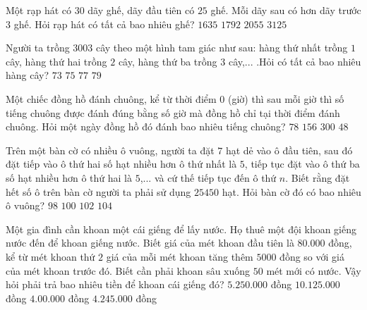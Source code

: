 \begin{ex}%
	Một rạp hát có $30$ dãy ghế, dãy đầu tiên có $25$ ghế. Mỗi dãy sau có hơn dãy trước $3$ ghế. Hỏi rạp
	hát có tất cả bao nhiêu ghế?
	\choice
	{$1635$}
	{$1792$}
	{\True $2055$}
	{$3125$}
\end{ex}
\begin{ex}%
	Người ta trồng $3003$ cây theo một hình tam giác như sau: hàng thứ nhất trồng $1$ cây, hàng thứ hai trồng $2$ cây, hàng thứ ba trồng $3$ cây,... .Hỏi có tất cả bao nhiêu hàng cây?
	\choice
	{$73$}
	{$75$}
	{\True $77$}
	{$79$}
\end{ex}
\begin{ex}%
	Một chiếc đồng hồ đánh chuông, kể từ thời điểm $0$ (giờ) thì sau mỗi giờ thì số tiếng chuông được đánh đúng bằng số giờ mà đồng hồ chỉ tại thời điểm đánh chuông. Hỏi một ngày đồng hồ đó đánh bao nhiêu tiếng chuông?
	\choice
	{$78$}
	{$156$}
	{\True $300$}
	{$48$}
\end{ex}
\begin{ex}%
	Trên một bàn cờ có nhiều ô vuông, người ta đặt $7$ hạt dẻ vào ô đầu tiên, sau đó đặt tiếp vào ô thứ
	hai số hạt nhiều hơn ô thứ nhất là $5$, tiếp tục đặt vào ô thứ ba số hạt nhiều hơn ô thứ hai là $5$,...
	và cứ thế tiếp tục đến ô thứ $n$. Biết rằng đặt hết số ô trên bàn cờ người ta phải sử dụng $25450$
	hạt. Hỏi bàn cờ đó có bao nhiêu ô vuông?
	\choice
	{$98$}
	{\True $100$}
	{$102$}
	{$104$}
\end{ex}
\begin{ex}%
	Một gia đình cần khoan một cái giếng để lấy nước. Họ thuê một đội khoan giếng nước đến để khoan giếng nước. Biết giá của mét khoan đầu tiên là $80.000$ đồng, kể từ mét khoan thứ $2$ giá của mỗi mét khoan tăng thêm $5000$ đồng so với giá của mét khoan trước đó. Biết cần phải khoan sâu xuống $50$ mét mới có nước. Vậy hỏi phải trả bao nhiêu tiền để khoan cái giếng đó?
	\choice
	{$5.250.000$ đồng}
	{\True $10.125.000$ đồng}
	{$4.00.000$ đồng}
	{$4.245.000$ đồng}
\end{ex}
